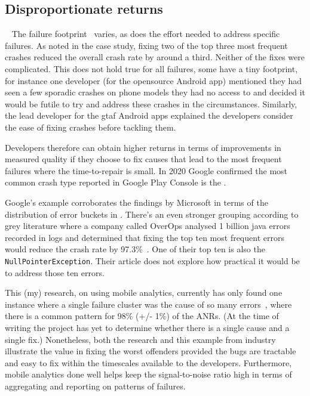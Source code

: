\subsection{Disproportionate returns}~\label{discussion-disproportionate-returns-topic}
The failure footprint~ varies, as does the effort needed to address specific failures. As noted in the  case study, fixing two of the top three most frequent crashes reduced the overall crash rate by around a third. Neither of the fixes were complicated. This does not hold true for all failures, some have a tiny footprint, for instance one developer (for the opensource  Android app)
mentioned they had seen a few sporadic crashes on phone models they had no access to and decided it would be futile to try and address these crashes in the circumstances. Similarly, the lead developer for the \Gls{gtaf} Android apps explained the developers consider the ease of fixing crashes before tackling them. 

Developers therefore can obtain higher returns in terms of improvements in measured quality if they choose to fix causes that lead to the most frequent failures where the time-to-repair is small. In 2020 Google confirmed the most common crash type reported in Google Play Console is the  .  %

Google's example corroborates the findings by Microsoft in terms of the distribution of error buckets in . There's an even stronger grouping according to grey literature where a company called OverOps analysed 1 billion java errors recorded in logs and determined that fixing the top ten most frequent errors would reduce the crash rate by 97.3\%~. One of their top ten is also the \texttt{NullPointerException}. Their article does not explore how practical it would be to address those ten errors. 

This (my) research, on using mobile analytics, currently has only found one instance where a single failure cluster was the cause of so many errors~, where there is a common pattern for 98\% (+/- 1\%) of the ANRs. (At the time of writing the project has yet to determine whether there is a single cause and a single fix.) Nonetheless, both the research and this example from industry illustrate the value in fixing the worst offenders provided the bugs are tractable and easy to fix within the timescales available to the developers. Furthermore, mobile analytics done well helps keep the signal-to-noise ratio high in terms of aggregating and reporting on patterns of failures.


